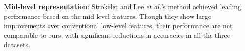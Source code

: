 \documentclass[letterpaper]{article}
\begin{document}

\textbf{Mid-level representation}: Strokelet \cite{Yao2014} and Lee \emph{et al.}'s method \cite{Lee2014} achieved leading performance based on the mid-level features. Though they show large improvements over conventional low-level features, their performance are not comparable to ours, with significant reductions in accuracies in all the three datasets.

%
\end{document}
